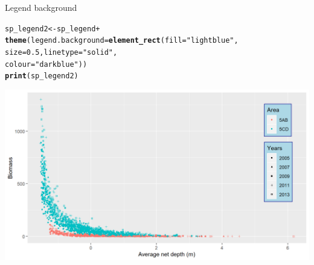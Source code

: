 \documentclass{beamer}\usepackage[]{graphicx}\usepackage[]{color}
\makeatletter
\newcommand{\hlnum}[1]{\textcolor[rgb]{0.686,0.059,0.569}{#1}}%
\newcommand{\hlstr}[1]{\textcolor[rgb]{0.192,0.494,0.8}{#1}}%
\newcommand{\hlopt}[1]{\textcolor[rgb]{0,0,0}{#1}}%
\newcommand{\hlstd}[1]{\textcolor[rgb]{0.345,0.345,0.345}{#1}}%
\newcommand{\hlkwb}[1]{\textcolor[rgb]{0.69,0.353,0.396}{#1}}%
\newcommand{\hlkwc}[1]{\textcolor[rgb]{0.333,0.667,0.333}{#1}}%
\newcommand{\hlkwd}[1]{\textcolor[rgb]{0.737,0.353,0.396}{\textbf{#1}}}%
\newenvironment{kframe}{%
 \def\at@end@of@kframe{}%
 \ifinner\ifhmode%
  \def\at@end@of@kframe{\end{minipage}}%
  \begin{minipage}{\columnwidth}%
 \fi\fi%
 \def\FrameCommand##1{\hskip\@totalleftmargin \hskip-\fboxsep
 \colorbox{shadecolor}{##1}\hskip-\fboxsep
     \hskip-\linewidth \hskip-\@totalleftmargin \hskip\columnwidth}%
 \MakeFramed {\advance\hsize-\width
   \@totalleftmargin\z@ \linewidth\hsize
   \@setminipage}}%
 {\par\unskip\endMakeFramed%
 \at@end@of@kframe}
\newenvironment{knitrout}{}{} %
\makeatother
\begin{document}
\begin{frame}[fragile]{Legend background}
\begin{knitrout}\footnotesize
{}\color{fgcolor}\begin{kframe}
\begin{alltt}
\hlstd{sp_legend2} \hlkwb{<-} \hlstd{sp_legend}  \hlopt{+}
  \hlkwd{theme}\hlstd{(}\hlkwc{legend.background} \hlstd{=} \hlkwd{element_rect}\hlstd{(}\hlkwc{fill}\hlstd{=}\hlstr{"lightblue"}\hlstd{,}
                                         \hlkwc{size}\hlstd{=}\hlnum{0.5}\hlstd{,} \hlkwc{linetype}\hlstd{=}\hlstr{"solid"}\hlstd{,}
                                         \hlkwc{colour} \hlstd{=}\hlstr{"darkblue"}\hlstd{))}
\hlkwd{print}\hlstd{(sp_legend2)}
\end{alltt}
\end{kframe}

{\centering \includegraphics[width=.9\linewidth]{figure/legend_b-1} 

}



\end{knitrout}
\end{frame}
\end{document}
